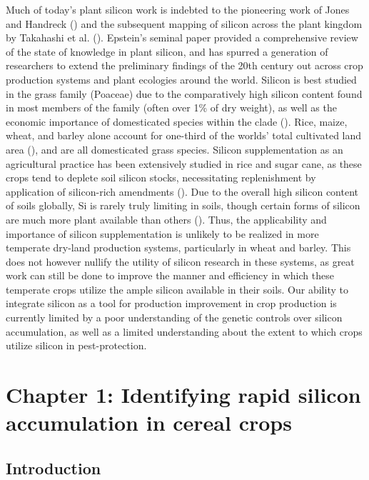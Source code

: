 \documentclass[12pt, letterpaper, ]{report}
\begin{document}
Much of today’s plant silicon work is indebted to the pioneering work of Jones and Handreck (\citeyear{jones_silica_1967}) and the subsequent mapping of silicon across the plant kingdom by Takahashi et al. (\citeyear{takahashi_possibility_1990}). Epstein’s seminal \citeyear{epstein_silicon_1999} paper provided a comprehensive review of the state of knowledge in plant silicon, and has spurred a generation of researchers to extend the preliminary findings of the 20th century out across crop production systems and plant ecologies around the world. Silicon is best studied in the grass family (Poaceae) due to the comparatively high silicon content found in most members of the family (often over 1\% of dry weight), as well as the economic importance of domesticated species within the clade (\cite{reynolds_silicon_2016}). Rice, maize, wheat, and barley alone account for one-third of the worlds’ total cultivated land area (\cite{faostat}), and are all domesticated grass species. Silicon supplementation as an agricultural practice has been extensively studied in rice and sugar cane, as these crops tend to deplete soil silicon stocks, necessitating replenishment by application of silicon-rich amendments (\cite{haynes_contemporary_2014,meena_case_2014}). Due to the overall high silicon content of soils globally, Si is rarely truly limiting in soils, though certain forms of silicon are much more plant available than others (\cite{fraysse_surface_2009}). Thus, the applicability and importance of silicon supplementation is unlikely to be realized in more temperate dry-land production systems, particularly in wheat and barley. This does not however nullify the utility of silicon research in these systems, as great work can still be done to improve the manner and efficiency in which these temperate crops utilize the ample silicon available in their soils. Our ability to integrate silicon as a tool for production improvement in crop production is currently limited by a poor understanding of the genetic controls over silicon accumulation, as well as a limited understanding about the extent to which crops utilize silicon in pest-protection. 

\printbibliography

\chapter{Chapter 1: Identifying rapid silicon accumulation in cereal crops}

\section{Introduction}
\end{document}
